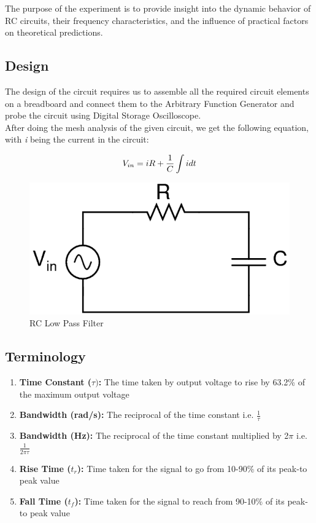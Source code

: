 \documentclass[12pt]{article}
\begin{document}
The purpose of the experiment is to provide insight into the dynamic behavior of RC circuits, their frequency characteristics, and the influence of practical factors on theoretical predictions.

\subsection{Design}
The design of the circuit requires us to assemble all the required circuit elements on a breadboard and connect them to the Arbitrary Function Generator and probe the circuit using Digital Storage Oscilloscope.  \\
\hspace*{1cm}  After doing the mesh analysis of the given circuit, we get the following equation, with \textit{i} being the current in the circuit: 

\begin{equation}
     V_{in}
        \\
     = iR + \frac{1}{C}\int idt   
\end{equation}     

\begin{figure}[h!]
\centering
\includegraphics[scale = 0.3]{1.png}
\caption{RC Low Pass Filter}
\end{figure}


\subsection{Terminology}
\begin{enumerate}
\item \textbf{Time Constant (\(\tau)\):} The time taken by output voltage to rise by 63.2\% of the maximum output voltage
\item \textbf{Bandwidth (rad/s):} The
 reciprocal of the time constant i.e. \(\frac{1}{\tau}\)
 \item \textbf{Bandwidth (Hz):} The
 reciprocal of the time constant multiplied by 2\(\pi\) i.e. \(\frac{1}{2\pi\tau}\)
 \item \textbf{Rise Time (\(t_r\)):} Time taken for the signal to go from 10-90\% of its peak-to peak value
 \item \textbf{Fall Time (\(t_f\)):} Time taken for the signal to reach from 90-10\% of its peak-to peak value
\end{enumerate}
\end{document}

